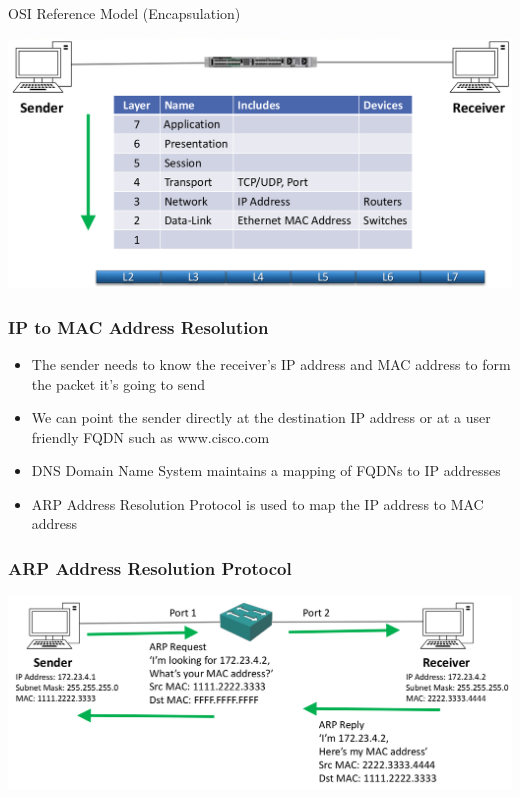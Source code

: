 \documentclass[pdflatex,compress,mathserif]{beamer}
\begin{document}
\begin{frame}{OSI Reference Model (Encapsulation)}
	\begin{center}
		\includegraphics[width=\linewidth]{img/img07}
	\end{center}
\end{frame}

\begin{frame}
	\frametitle{IP to MAC Address Resolution}
	\begin{itemize}
		\item The sender needs to know the receiver’s IP address and MAC address to form the packet it’s going to send
		\item We can point the sender directly at the destination IP address or at a user friendly FQDN such as www.cisco.com
		\item DNS Domain Name System maintains a mapping of FQDNs to IP addresses
		\item ARP Address Resolution Protocol is used to map the IP address to MAC address
	\end{itemize}
\end{frame}

\begin{frame}
	\frametitle{ARP Address Resolution Protocol}
	\begin{center}
		\includegraphics[width=\linewidth]{img/img08}
	\end{center}
\end{frame}
\end{document}

